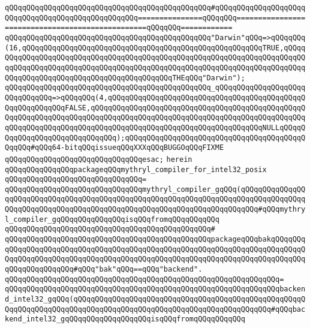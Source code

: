 \verb|qQQqqQQqqQQqqQQqqQQqqQQqqQQqqQQqqQQqqQQqqQQqqQQq#qQQqqQQqqQQqqQQqqQQqqQQqqQQqqQQqqQQqqQQqqQQqqQQqqQQq===============qQQqqQQq=================================================qQQqqQQq============|\newline
\verb|qQQqqQQqqQQqqQQqqQQqqQQqqQQqqQQqqQQqqQQqqQQqqQQq"Darwin"qQQq=>qQQqqQQq(16,qQQqqQQqqQQqqQQqqQQqqQQqqQQqqQQqqQQqqQQqqQQqqQQqqQQqqQQqTRUE,qQQqqQQqqQQqqQQqqQQqqQQqqQQqqQQqqQQqqQQqqQQqqQQqqQQqqQQqqQQqqQQqqQQqqQQqqQQqqQQqqQQqqQQqqQQqqQQqqQQqqQQqqQQqqQQqqQQqqQQqqQQqqQQqqQQqqQQqqQQqqQQqqQQqqQQqqQQqqQQqqQQqqQQqqQQqqQQqqQQqqQQqTHEqQQq"Darwin");|\newline
\verb|qQQqqQQqqQQqqQQqqQQqqQQqqQQqqQQqqQQqqQQqqQQqqQQq_qQQqqQQqqQQqqQQqqQQqqQQqqQQqqQQq=>qQQqqQQq(4,qQQqqQQqqQQqqQQqqQQqqQQqqQQqqQQqqQQqqQQqqQQqqQQqqQQqqQQqqQQqFALSE,qQQqqQQqqQQqqQQqqQQqqQQqqQQqqQQqqQQqqQQqqQQqqQQqqQQqqQQqqQQqqQQqqQQqqQQqqQQqqQQqqQQqqQQqqQQqqQQqqQQqqQQqqQQqqQQqqQQqqQQqqQQqqQQqqQQqqQQqqQQqqQQqqQQqqQQqqQQqqQQqqQQqqQQqqQQqqQQqqQQqNULLqQQqqQQqqQQqqQQqqQQqqQQqqQQqqQQq);qQQqqQQqqQQqqQQqqQQqqQQqqQQqqQQqqQQqqQQqqQQqqQQq#qQQq64-bitqQQqissueqQQqXXXqQQqBUGGOqQQqFIXME|\newline
\verb|qQQqqQQqqQQqqQQqqQQqqQQqqQQqqQQqesac;|\newline
\verb|herein|\newline
\newline
\verb|qQQqqQQqqQQqqQQqpackageqQQqmythryl_compiler_for_intel32_posix|\newline
\verb|qQQqqQQqqQQqqQQqqQQqqQQqqQQqqQQq=|\newline
\verb|qQQqqQQqqQQqqQQqqQQqqQQqqQQqqQQqmythryl_compiler_gqQQq(qQQqqQQqqQQqqQQqqQQqqQQqqQQqqQQqqQQqqQQqqQQqqQQqqQQqqQQqqQQqqQQqqQQqqQQqqQQqqQQqqQQqqQQqqQQqqQQqqQQqqQQqqQQqqQQqqQQqqQQqqQQqqQQqqQQqqQQqqQQqqQQq#qQQqmythryl_compiler_gqQQqqQQqqQQqqQQqisqQQqfromqQQqqQQqqQQq|\newline
\verb|qQQqqQQqqQQqqQQqqQQqqQQqqQQqqQQqqQQqqQQqqQQqqQQq#|\newline
\verb|qQQqqQQqqQQqqQQqqQQqqQQqqQQqqQQqqQQqqQQqqQQqqQQqpackageqQQqbakqQQqqQQqqQQqqQQqqQQqqQQqqQQqqQQqqQQqqQQqqQQqqQQqqQQqqQQqqQQqqQQqqQQqqQQqqQQqqQQqqQQqqQQqqQQqqQQqqQQqqQQqqQQqqQQqqQQqqQQqqQQqqQQqqQQqqQQqqQQqqQQqqQQqqQQqqQQqqQQqqQQq#qQQq"bak"qQQq==qQQq"backend".|\newline
\verb|qQQqqQQqqQQqqQQqqQQqqQQqqQQqqQQqqQQqqQQqqQQqqQQqqQQqqQQqqQQqqQQq=|\newline
\verb|qQQqqQQqqQQqqQQqqQQqqQQqqQQqqQQqqQQqqQQqqQQqqQQqqQQqqQQqqQQqqQQqbackend_intel32_gqQQq(qQQqqQQqqQQqqQQqqQQqqQQqqQQqqQQqqQQqqQQqqQQqqQQqqQQqqQQqqQQqqQQqqQQqqQQqqQQqqQQqqQQqqQQqqQQqqQQqqQQqqQQqqQQqqQQqqQQq#qQQqbackend_intel32_gqQQqqQQqqQQqqQQqqQQqisqQQqfromqQQqqQQqqQQq|\newline
